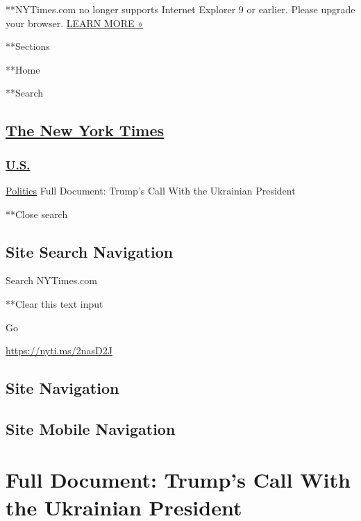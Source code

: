  **NYTimes.com no longer supports Internet Explorer 9 or earlier. Please
upgrade your browser.
\href{http://www.nytimes.com/content/help/site/ie9-support.html}{LEARN
MORE »}

**Sections

**Home

**Search

\hypertarget{the-new-york-times}{%
\subsection{\texorpdfstring{\href{http://www.nytimes.com/}{The New York
Times}}{The New York Times}}\label{the-new-york-times}}

\hypertarget{-us-}{%
\subsubsection{\texorpdfstring{
\href{https://www.nytimes.com/section/us}{U.S.} }{ U.S. }}\label{-us-}}

 \href{/section/politics}{Politics} \textbar{}Full Document: Trump's
Call With the Ukrainian President

**Close search

\hypertarget{site-search-navigation}{%
\subsection{Site Search Navigation}\label{site-search-navigation}}

Search NYTimes.com

**Clear this text input

Go

\url{https://nyti.ms/2nasD2J}

\hypertarget{site-navigation}{%
\subsection{Site Navigation}\label{site-navigation}}

\hypertarget{site-mobile-navigation}{%
\subsection{Site Mobile Navigation}\label{site-mobile-navigation}}

\hypertarget{full-document-trumps-call-with-the-ukrainian-president}{%
\section{Full Document: Trump's Call With the Ukrainian
President}\label{full-document-trumps-call-with-the-ukrainian-president}}

